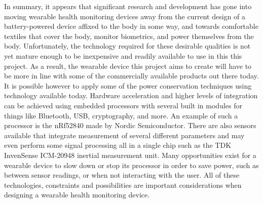 In summary, it appears that significant research and development has gone into
moving wearable health monitoring devices away from the current design of a
battery-powered device affixed to the body in some way, and towards comfortable
textiles that cover the body, monitor biometrics, and power themselves from the
body.  Unfortunately, the technology required for these desirable qualities is 
not yet mature enough to be inexpensive and readily available to use in this this project.  
As a result, the wearable device this project aims to create will have to be 
more in line with some of the commercially available products out there today. 
It is possible however to apply some of the power conservation techniques using 
technology available today. Hardware acceleration and higher levels of 
integration can be achieved using embedded processors with several built in
modules for things like Bluetooth, USB, cryptography, and more. An example of
such a processor is the nRf52840 made by Nordic Semiconductor. There are also
sensors available that integrate measurement of several different parameters 
and may even perform some signal processing all in a single chip such as the 
TDK InvenSense ICM-20948 inertial measurement unit. Many opportunities exist 
for a wearable device to slow down or stop its processor in order to save power, 
such as between sensor readings, or when not interacting with the user. All of 
these technologies, constraints and possibilities are important considerations 
when designing a wearable health monitoring device.
